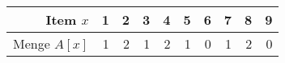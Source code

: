 \begin{tabular}{|r|rrrrrrrrr|}
\hline
Item $x$ & 1 & 2 & 3 & 4 & 5 & 6 & 7 & 8 & 9\\
\hline
Menge $A[x]$ & 1 & 2 & 1 & 2 & 1 & 0 & 1 & 2 & 0\\
\hline
\end{tabular}